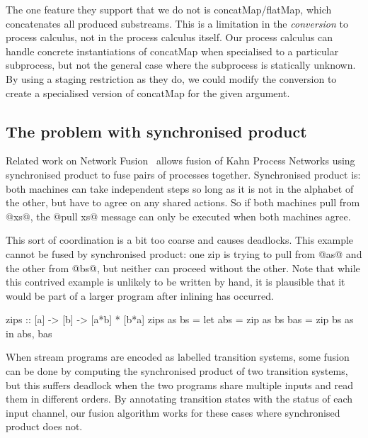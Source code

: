 The one feature they support that we do not is concatMap/flatMap, which concatenates all produced substreams.
This is a limitation in the \emph{conversion} to process calculus, not in the process calculus itself.
Our process calculus can handle concrete instantiations of concatMap when specialised to a particular subprocess, but not the general case where the subprocess is statically unknown.
By using a staging restriction as they do, we could modify the conversion to create a specialised version of concatMap for the given argument.


\subsection{The problem with synchronised product}
\label{s:Synchro}
Related work on Network Fusion~\cite{fradet2004network} allows fusion of Kahn Process Networks using synchronised product to fuse pairs of processes together.
Synchronised product is: both machines can take independent steps so long as it is not in the alphabet of the other, but have to agree on any shared actions.
So if both machines pull from @xs@, the @pull xs@ message can only be executed when both machines agree.

This sort of coordination is a bit too coarse and causes deadlocks.
This example cannot be fused by synchronised product: one zip is trying to pull from @as@ and the other from @bs@, but neither can proceed without the other.
Note that while this contrived example is unlikely to be written by hand, it is plausible that it would be part of a larger program after inlining has occurred.

\begin{code}
zips :: [a] -> [b] -> [a*b] * [b*a]
zips as bs =
  let abs = zip as bs
      bas = zip bs as
  in  abs, bas
\end{code}

When stream programs are encoded as labelled transition systems, some fusion can be done by computing the synchronised product of two transition systems, but this suffers deadlock when the two programs share multiple inputs and read them in different orders.
By annotating transition states with the status of each input channel, our fusion algorithm works for these cases where synchronised product does not.


